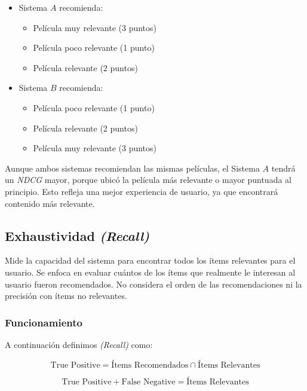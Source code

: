\documentclass[11pt,a4paper,twoside]{thesis}
\begin{document}
\begin{itemize}
	\item Sistema $A$ recomienda:
	      \begin{itemize}
		      \item Película muy relevante (3 puntos)
		      \item Película poco relevante (1 punto)
		      \item Película relevante (2 puntos)
	      \end{itemize}

	\item Sistema $B$ recomienda:
	      \begin{itemize}
		      \item Película poco relevante (1 punto)
		      \item Película relevante (2 puntos)
		      \item  Película muy relevante (3 puntos)
	      \end{itemize}
\end{itemize}

Aunque ambos sistemas recomiendan las mismas películas, el Sistema $A$ tendrá un \textit{NDCG} mayor, porque ubicó la película más relevante o mayor puntuada al principio. Esto refleja una mejor experiencia de usuario, ya que encontrará contenido más relevante.

\subsection{Exhaustividad \textit{(Recall)}}

Mide la capacidad del sistema para encontrar todos los ítems relevantes para el usuario. Se enfoca en evaluar cuántos de los ítems que realmente le interesan al usuario fueron recomendados. No considera el orden de las recomendaciones ni la precisión con ítems no relevantes.

\subsubsection{Funcionamiento}

A continuación definimos \textit{(Recall)} como:

\begin{equation}
	\text{True Positive} = \text{Ítems Recomendados} \cap \text{Ítems Relevantes}
	\label{eq:tp}
\end{equation}

\begin{equation}
	\text{True Positive} + \text{False Negative} = \text{Ítems Relevantes}
	\label{eq:tp_fn}
\end{equation}
\end{document}
